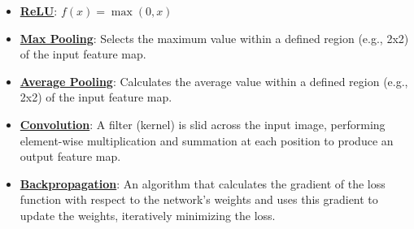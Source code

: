 \documentclass{article}%
\begin{document}
\begin{itemize}[leftmargin=*]%
\item \href{https://purdue.brightspace.com/d2l/common/assets/pdfjs-d2l-dist/1.0.14-legacy/web/viewer.html?file=\%2Fcontent\%2Fenforced\%2F1095467-wl.202510.CS.24300.001\%2F09L1-cnn.pdf\%3Fou\%3D1095467\&lang=en-us\&container=d2l-fileviewer-rendered-pdf\&fullscreen=d2l-fileviewer-rendered-pdf-dialog\&height=667#page=13}{\textbf{ReLU}}: $f(x) = \max(0, x)$%
\item \href{https://purdue.brightspace.com/d2l/common/assets/pdfjs-d2l-dist/1.0.14-legacy/web/viewer.html?file=\%2Fcontent\%2Fenforced\%2F1095467-wl.202510.CS.24300.001\%2F09L1-cnn.pdf\%3Fou\%3D1095467\&lang=en-us\&container=d2l-fileviewer-rendered-pdf\&fullscreen=d2l-fileviewer-rendered-pdf-dialog\&height=667#page=15}{\textbf{Max Pooling}}: Selects the maximum value within a defined region (e.g., 2x2) of the input feature map.%
\item \href{https://purdue.brightspace.com/d2l/common/assets/pdfjs-d2l-dist/1.0.14-legacy/web/viewer.html?file=\%2Fcontent\%2Fenforced\%2F1095467-wl.202510.CS.24300.001\%2F09L1-cnn.pdf\%3Fou\%3D1095467\&lang=en-us\&container=d2l-fileviewer-rendered-pdf\&fullscreen=d2l-fileviewer-rendered-pdf-dialog\&height=667#page=15}{\textbf{Average Pooling}}: Calculates the average value within a defined region (e.g., 2x2) of the input feature map.%
\item \href{https://purdue.brightspace.com/d2l/common/assets/pdfjs-d2l-dist/1.0.14-legacy/web/viewer.html?file=\%2Fcontent\%2Fenforced\%2F1095467-wl.202510.CS.24300.001\%2F09L1-cnn.pdf\%3Fou\%3D1095467\&lang=en-us\&container=d2l-fileviewer-rendered-pdf\&fullscreen=d2l-fileviewer-rendered-pdf-dialog\&height=667#page=6}{\textbf{Convolution}}: A filter (kernel) is slid across the input image, performing element-wise multiplication and summation at each position to produce an output feature map.%
\item \href{https://purdue.brightspace.com/d2l/common/assets/pdfjs-d2l-dist/1.0.14-legacy/web/viewer.html?file=\%2Fcontent\%2Fenforced\%2F1095467-wl.202510.CS.24300.001\%2F09L1-cnn.pdf\%3Fou\%3D1095467\&lang=en-us\&container=d2l-fileviewer-rendered-pdf\&fullscreen=d2l-fileviewer-rendered-pdf-dialog\&height=667#page=16}{\textbf{Backpropagation}}: An algorithm that calculates the gradient of the loss function with respect to the network's weights and uses this gradient to update the weights, iteratively minimizing the loss.%
\end{itemize}%
\end{document}

